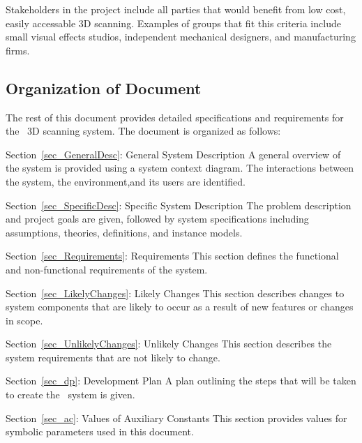 \documentclass[12pt]{article}
\begin{document}
Stakeholders in the project include all parties that would benefit from low cost, easily accessable 3D scanning. Examples of groups that fit this criteria include small visual effects studios, independent mechanical designers, and manufacturing firms. 

\subsection{Organization of Document}

The rest of this document provides detailed specifications and requirements for the \progname\ 3D scanning system. The document is organized as follows:  
  
\noindent \begin{description}
\item Section~\ref{sec_GeneralDesc}: General System Description 
\newline
A general overview of the system is provided using a system context diagram. The interactions between the system, the environment,and its users are identified.
\item Section~\ref{sec_SpecificDesc}: Specific System Description 
\newline 
The problem description and project goals are given, followed by system specifications including assumptions, theories, definitions, and instance models.
\item Section~\ref{sec_Requirements}: Requirements
\newline
This section defines the functional and non-functional requirements of the system.
\item Section~\ref{sec_LikelyChanges}: Likely Changes
\newline
This section describes changes to system components that are likely to occur as a result of new features or changes in scope.
\item Section~\ref{sec_UnlikelyChanges}: Unlikely Changes 
\newline
This section describes the system requirements that are not likely to change.
\item Section~\ref{sec_dp}: Development Plan 
\newline
A plan outlining the steps that will be taken to create the \progname\ system is given.
\item Section~\ref{sec_ac}: Values of Auxiliary Constants 
\newline
This section provides values for symbolic parameters used in this document.
\end{description}
\end{document}
